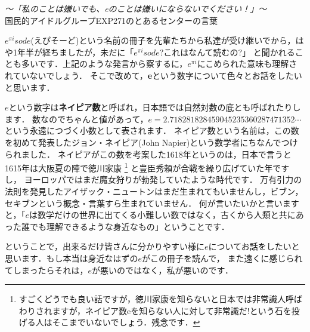 


\begin{flushright}
\textit {〜「私のことは嫌いでも、eのことは嫌いにならないでください！」〜}\\
国民的アイドルグループEXP271のとあるセンターの言葉
\end{flushright}

$e^{\pi i}sode$(えぴそーど)という名前の冊子を先輩たちから私達が受け継いでから，はや1年半が経ちましたが，未だに「$e^{\pi i}sode$?これはなんて読むの?」
と聞かれることも多いです．上記のような発言から察するに，$e^{\pi i}$にこめられた意味も理解されていないでしょう．
そこで改めて，\textbf{e}という数字について色々とお話をしたいと思います．

$e$という数字は\textbf{ネイピア数}と呼ばれ，日本語では自然対数の底とも呼ばれたりします．
数なのでちゃんと値があって，$e = 2.718281828459045235360287471352\cdots$という永遠につづく小数として表されます．
ネイピア数という名前は，この数を初めて発表したジョン・ネイピア(John Napier)という数学者にちなんでつけられました．
ネイピアがこの数を考案した1618年というのは，日本で言うと1615年は大阪夏の陣で徳川家康
\footnote{すごくどうでも良い話ですが，徳川家康を知らないと日本では非常識人呼ばわりされますが，ネイピア数eを知らない人に対して非常識だ!という石を投げる人はそこまでいないでしょう．残念です．} と豊臣秀頼が合戦を繰り広げていた年ですし，
ヨーロッパではまだ魔女狩りが勃発していたような時代です．
万有引力の法則を発見したアイザック・ニュートンはまだ生まれてもいませんし，ビブン，セキブンという概念・言葉すら生まれていません．
何が言いたいかと言いますと，「$e$は数学だけの世界に出てくる小難しい数ではなく，古くから人類と共にあった誰でも理解できるような身近なもの」ということです．

ということで，出来るだけ皆さんに分かりやすい様に$e$についてお話をしたいと思います．もし本当は身近なはずの$e$がこの冊子を読んで，
また遠くに感じられてしまったらそれは，$e$が悪いのではなく，私が悪いのです．

